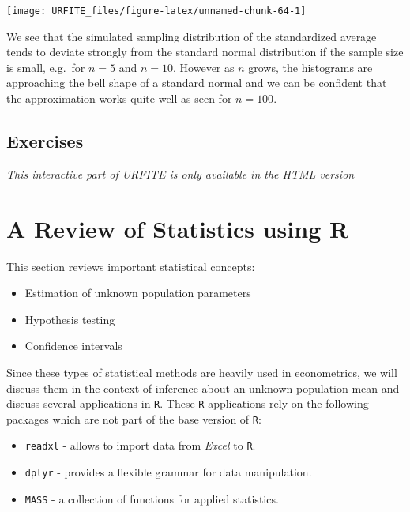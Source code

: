 \documentclass[]{book}
\theoremstyle{definition}
\theoremstyle{definition}
\theoremstyle{definition}
\theoremstyle{remark}
\begin{document}
\begin{center}\texttt{[image: URFITE\_files/figure-latex/unnamed-chunk-64-1]} \end{center}

We see that the simulated sampling distribution of the standardized
average tends to deviate strongly from the standard normal distribution
if the sample size is small, e.g.~for \(n=5\) and \(n=10\). However as
\(n\) grows, the histograms are approaching the bell shape of a standard
normal and we can be confident that the approximation works quite well
as seen for \(n=100\).

\section{Exercises}\label{exercises}

\begin{center}\textit{This interactive part of URFITE is only available in the HTML version}\end{center}

\chapter{A Review of Statistics using R}\label{arosur}

This section reviews important statistical concepts:

\begin{itemize}
\item
  Estimation of unknown population parameters
\item
  Hypothesis testing
\item
  Confidence intervals
\end{itemize}

Since these types of statistical methods are heavily used in
econometrics, we will discuss them in the context of inference about an
unknown population mean and discuss several applications in \texttt{R}.
These \texttt{R} applications rely on the following packages which are
not part of the base version of \texttt{R}:

\begin{itemize}
\item
  \texttt{readxl} - allows to import data from \emph{Excel} to
  \texttt{R}.
\item
  \texttt{dplyr} - provides a flexible grammar for data manipulation.
\item
  \texttt{MASS} - a collection of functions for applied statistics.
\end{itemize}
\end{document}

